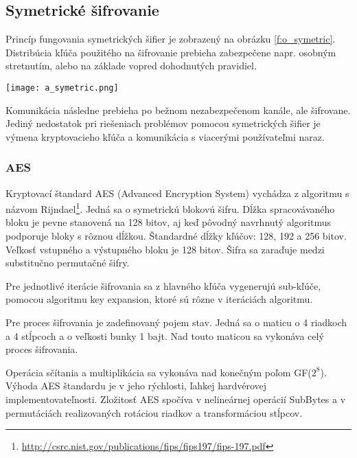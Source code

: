 \documentclass[12pt,a4paper,oneside,openright]{report}
\begin{document}

\subsection{Symetrické šifrovanie} \label{s_cpyt_symetric}
Princíp fungovania symetrických šifier je zobrazený na obrázku \ref{f:o_symetric}. Distribúcia kľúča použitého na šifrovanie prebieha zabezpečene napr. osobným stretnutím, alebo na základe vopred dohodnutých pravidiel.

\begin{figure*}[!hbt]
	\centering
	\texttt{[image: a\_symetric.png]}
	\caption{Princíp fungovania symetrických šifier \cite{cryptographyhandbook}.}
	\label{f:o_symetric}
\end{figure*}

Komunikácia následne prebieha po bežnom nezabezpečenom kanále, ale šifrovane. Jediný nedostatok pri riešeniach problémov pomocou symetrických šifier je výmena kryptovacieho kľúča a komunikácia s viacerými používateľmi naraz.

\subsubsection{AES} %
Kryptovací štandard AES (Advanced Encryption System) vychádza z algoritmu s názvom Rijndael\footnote{\url{http://csrc.nist.gov/publications/fips/fips197/fips-197.pdf}}. Jedná sa o symetrickú blokovú šifru. Dĺžka spracovávaného bloku je pevne stanovená na 128 bitov, aj keď pôvodný navrhnutý algoritmus podporuje bloky s rôznou dĺžkou. Štandardné dĺžky kľúčov: 128, 192 a 256 bitov. Veľkosť vstupného a výstupného bloku je 128 bitov. Šifra sa zaraďuje medzi substitučno permutačné šifry.

Pre jednotlivé iterácie šifrovania sa z hlavného kľúča vygenerujú sub-kľúče, pomocou algoritmu key expansion, ktoré sú rôzne v iteráciách algoritmu.

Pre proces šifrovania je zadefinovaný pojem stav. Jedná sa o maticu o 4 riadkoch a 4 stĺpcoch a o veľkosti bunky 1 bajt. Nad touto maticou sa vykonáva celý proces šifrovania.

Operácia sčítania a multiplikácia sa vykonáva nad konečným poľom GF($2^8$).
Výhoda AES štandardu je v jeho rýchlosti, ľahkej hardvérovej  implementovateľnosti. Zložitosť AES spočíva v nelineárnej operácií SubBytes a v permutáciách realizovaných rotáciou riadkov a transformáciou stĺpcov.
\end{document}

